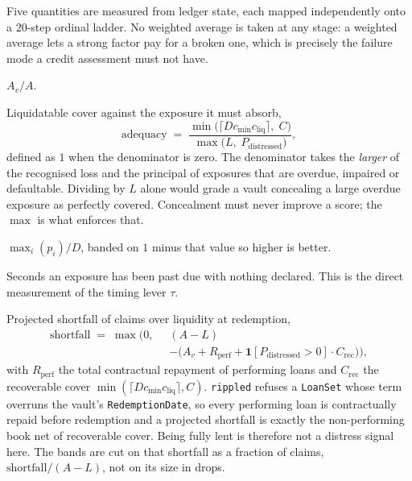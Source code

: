 \documentclass[11pt]{article}
\theoremstyle{orma}
\theoremstyle{ormaupright}
\begin{document}
Five quantities are measured from ledger state, each mapped independently onto a $20$-step
ordinal ladder. No weighted average is taken at any stage: a weighted average lets a strong
factor pay for a broken one, which is precisely the failure mode a credit assessment must
not have.

\begin{description}
\itemsep7pt
\item[Liquidity.] $A_v / A$.
\pagebreak
\item[First-loss adequacy.] Liquidatable cover against the exposure it must absorb,
\begin{equation}
  \mathrm{adequacy}
  \;=\;
  \frac{\min\big( \lceil D c_{\min} c_{\mathrm{liq}} \rceil,\; C \big)}
       {\max\big( L,\; P_{\mathrm{distressed}} \big)},
\end{equation}
defined as $1$ when the denominator is zero. The denominator takes the \emph{larger} of the
recognised loss and the principal of exposures that are overdue, impaired or defaultable.
Dividing by $L$ alone would grade a vault concealing a large overdue exposure as perfectly
covered. Concealment must never improve a score; the $\max$ is what enforces that.
\item[Concentration.] $\max_i (p_i) / D$, banded on $1$ minus that value so higher is better.
\item[Recognition lag.] Seconds an exposure has been past due with nothing declared. This is
the direct measurement of the timing lever $\tau$.
\item[Redemption cliff.] Projected shortfall of claims over liquidity at redemption,
\begin{equation}
\begin{split}
  \mathrm{shortfall} \;=\; \max\Big( 0,\;\; &(A - L)
  \\[2pt]
  &- \big( A_v + R_{\mathrm{perf}}
     + \mathbf{1}[P_{\mathrm{distressed}} > 0] \cdot C_{\mathrm{rec}} \big) \Big),
\end{split}
\end{equation}
with $R_{\mathrm{perf}}$ the total contractual repayment of performing loans and
$C_{\mathrm{rec}}$ the recoverable cover
$\min(\lceil D c_{\min} c_{\mathrm{liq}} \rceil, C)$. \texttt{rippled} refuses a
\texttt{LoanSet} whose term overruns the vault's \texttt{RedemptionDate}, so every
performing loan is contractually repaid before redemption and a projected shortfall is
exactly the non-performing book net of recoverable cover. Being fully lent is therefore not
a distress signal here. The bands are cut on that shortfall as a fraction of claims,
$\mathrm{shortfall}/(A - L)$, not on its size in drops.
\end{description}
\end{document}

